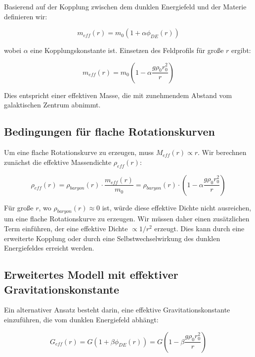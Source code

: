 \documentclass[a4paper,12pt]{article}
\begin{document}
	Basierend auf der Kopplung zwischen dem dunklen Energiefeld und der Materie definieren wir:
	
	\begin{equation}
		m_{eff}(r) = m_0(1 + \alpha\phi_{DE}(r))
	\end{equation}
	
	wobei $\alpha$ eine Kopplungskonstante ist. Einsetzen des Feldprofils für große $r$ ergibt:
	
	\begin{equation}
		m_{eff}(r) = m_0\left(1 - \alpha\frac{g\rho_0 r_0^2}{r}\right)
	\end{equation}
	
Dies entspricht einer effektiven Masse, die mit zunehmendem Abstand vom galaktischen Zentrum abnimmt.

\subsection{Bedingungen für flache Rotationskurven}

Um eine flache Rotationskurve zu erzeugen, muss $M_{eff}(r) \propto r$. Wir berechnen zunächst die effektive Massendichte $\rho_{eff}(r)$:

\begin{equation}
	\rho_{eff}(r) = \rho_{baryon}(r) \cdot \frac{m_{eff}(r)}{m_0} = \rho_{baryon}(r) \cdot \left(1 - \alpha\frac{g\rho_0 r_0^2}{r}\right)
\end{equation}

Für große $r$, wo $\rho_{baryon}(r) \approx 0$ ist, würde diese effektive Dichte nicht ausreichen, um eine flache Rotationskurve zu erzeugen. Wir müssen daher einen zusätzlichen Term einführen, der eine effektive Dichte $\propto 1/r^2$ erzeugt. Dies kann durch eine erweiterte Kopplung oder durch eine Selbstwechselwirkung des dunklen Energiefeldes erreicht werden.

\subsection{Erweitertes Modell mit effektiver Gravitationskonstante}

Ein alternativer Ansatz besteht darin, eine effektive Gravitationskonstante einzuführen, die vom dunklen Energiefeld abhängt:

\begin{equation}
G_{eff}(r) = G\left(1 + \beta\phi_{DE}(r)\right) = G\left(1 - \beta\frac{g\rho_0 r_0^2}{r}\right)
\end{equation}
\end{document}
